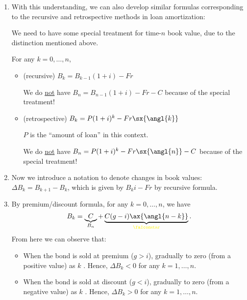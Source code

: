 \begin{enumerate}
\item \label{it:book-value-retro-recur-fmlas}
With this understanding, we can also develop similar formulas
corresponding to the recursive and retrospective methods in loan amortization:
\begin{note}
We need to have some special treatment for time-\(n\) book value, due to the
distinction mentioned above.
\end{note}
For any \(k=0,\dotsc,n\),
\begin{itemize}
\item (recursive) \(B_{k}=B_{k-1}(1+i)-Fr\)
\begin{warning}
We do \underline{not} have \(B_n=B_{n-1}(1+i)-Fr-C\) because of the special treatment!
\end{warning}
\item (retrospective) \(B_k=P(1+i)^k-Fr\sx{\angl{k}}\)
\begin{note}
\(P\) is the ``amount of loan'' in this context.
\end{note}
\begin{warning}
We do \underline{not} have \(B_n=P(1+i)^k-Fr\sx{\angl{n}}-C\) because of the special treatment!
\end{warning}
\end{itemize}

\item Now we introduce a notation to denote changes in book values: \(\Delta
B_k=B_{k+1}-B_k\), which is given by \(B_ki-Fr\) by recursive formula.

\item By premium/discount formula, for any \(k=0,\dotsc,n\), we have
\[
B_k=\underbrace{C}_{B_n}+\underbrace{C(g-i)\ax{\angl{n-k}}}_{\text{\ystar}}.
\]
From here we can observe that:
\begin{itemize}
\item When the bond is sold at premium (\(g>i\)), \ystar{} gradually
 to zero (from a positive value) as \(k\) . Hence,
\(\Delta B_k<0\) for any \(k=1,\dotsc,n\).


\item When the bond is sold at discount (\(g<i\)), \ystar{} gradually
 to zero (from a negative value) as \(k\) . Hence,
\(\Delta B_k>0\) for any \(k=1,\dotsc,n\).


\end{itemize}
\end{enumerate}
